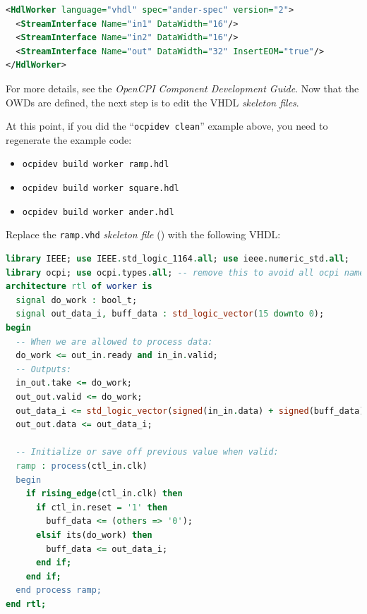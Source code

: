 \begin{lstlisting}[language=xml]
<HdlWorker language="vhdl" spec="ander-spec" version="2">
  <StreamInterface Name="in1" DataWidth="16"/>
  <StreamInterface Name="in2" DataWidth="16"/>
  <StreamInterface Name="out" DataWidth="32" InsertEOM="true"/>
</HdlWorker>
\end{lstlisting}
\bend

For more details, see the \textit{OpenCPI Component Development Guide}. Now that the OWDs are defined, the next step is to edit the VHDL \textit{skeleton files}.

\bstart
At this point, if you did the ``\texttt{ocpidev clean}'' example above, you need to regenerate the example code:
\begin{itemize}
\setlength\itemsep{0pt}
\item \texttt{ocpidev build worker ramp.hdl}
\item \texttt{ocpidev build worker square.hdl}
\item \texttt{ocpidev build worker ander.hdl}


\end{itemize}
\bend
\bstart
Replace the \verb+ramp.vhd+ \textit{skeleton file} () with the following VHDL:
\begin{lstlisting}[language=vhdl, columns=fullflexible, breaklines=true, prebreak=\textbackslash, basicstyle=\ttfamily, showstringspaces=false, upquote=true]
library IEEE; use IEEE.std_logic_1164.all; use ieee.numeric_std.all;
library ocpi; use ocpi.types.all; -- remove this to avoid all ocpi name collisions
architecture rtl of worker is
  signal do_work : bool_t;
  signal out_data_i, buff_data : std_logic_vector(15 downto 0);
begin
  -- When we are allowed to process data:
  do_work <= out_in.ready and in_in.valid;
  -- Outputs:
  in_out.take <= do_work;
  out_out.valid <= do_work;
  out_data_i <= std_logic_vector(signed(in_in.data) + signed(buff_data));
  out_out.data <= out_data_i;

  -- Initialize or save off previous value when valid:
  ramp : process(ctl_in.clk)
  begin
    if rising_edge(ctl_in.clk) then
      if ctl_in.reset = '1' then
        buff_data <= (others => '0');
      elsif its(do_work) then
        buff_data <= out_data_i;
      end if;
    end if;
  end process ramp;
end rtl;
\end{lstlisting}
